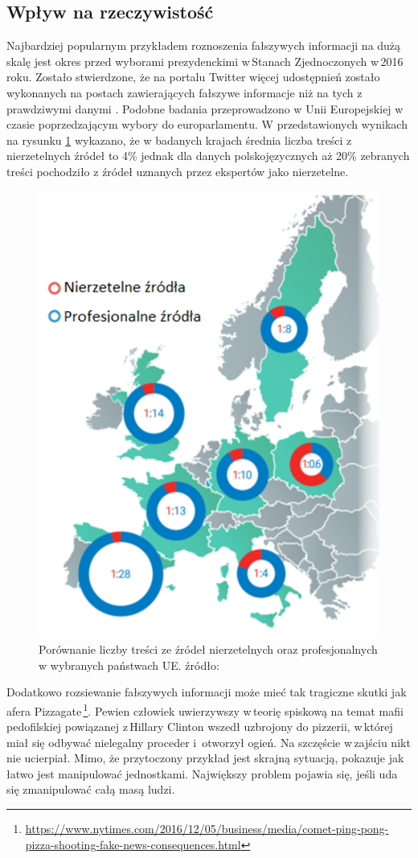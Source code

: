 \subsection{Wpływ na rzeczywistość}
Najbardziej popularnym przykładem roznoszenia fałszywych informacji na dużą skalę jest okres przed wyborami prezydenckimi w\,Stanach Zjednoczonych w\,2016 roku. Zostało stwierdzone, że na portalu Twitter więcej udostępnień zostało wykonanych na postach zawierających fałszywe informacje niż na tych z\,prawdziwymi danymi  \cite{neudertpolarization2018}. Podobne badania przeprowadzono w Unii Europejskiej w czasie poprzedzającym wybory do europarlamentu. W przedstawionych wynikach na rysunku \ref{fig:EUMapJunkNews} wykazano, że w badanych krajach średnia liczba treści z nierzetelnych źródeł to 4\% jednak dla danych polskojęzycznych aż 20\% zebranych treści pochodziło z źródeł uznanych przez ekspertów jako nierzetelne\cite{marchal2019junk}.
\begin{figure}[!h]
	
	\centering \includegraphics[width=0.5\linewidth]{img/EUMapJunkNews.PNG}
	\caption{Porównanie liczby treści ze źródeł nierzetelnych oraz profesjonalnych w wybranych państwach UE. źródło: \cite{marchal2019junk}}
	\label{fig:EUMapJunkNews}
\end{figure}
\par
Dodatkowo rozsiewanie fałszywych informacji może mieć tak tragiczne skutki jak afera Pizzagate\,\footnote{\url{https://www.nytimes.com/2016/12/05/business/media/comet-ping-pong-pizza-shooting-fake-news-consequences.html}}. Pewien człowiek uwierzywszy w\,teorię spiskową na temat mafii pedofilskiej powiązanej z\,Hillary Clinton wszedł uzbrojony do pizzerii, w\,której miał się odbywać nielegalny proceder i \,otworzył ogień. Na szczęście w\,zajściu nikt nie ucierpiał. Mimo, że przytoczony przykład jest skrajną sytuacją, pokazuje jak łatwo jest manipulować jednostkami. Największy problem pojawia się, jeśli uda się zmanipulować całą masą ludzi. 
